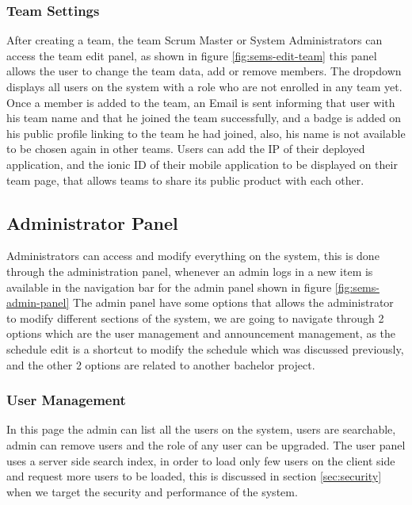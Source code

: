 \subsubsection{Team Settings}
\label{subs:team-settings}
After creating a team, the team Scrum Master or System Administrators can access the team edit panel, as shown in figure \ref{fig:sems-edit-team}
this panel allows the user to change the team data, add or remove members. The  dropdown displays all users on the system
with a  role who are not enrolled in any team yet. Once a member is added to the team, an Email is sent informing that user
with his team name and that he joined the team successfully, and a badge is added on his public profile linking to the team he had joined,
also, his name is not available to be chosen again in other teams. Users can add the IP of their deployed application, and the ionic ID of their
mobile application to be displayed on their team page, that allows teams to share its public product with each other.

\subsection{Administrator Panel}
\label{sub:admin-panel}
Administrators can access and modify everything on the system, this is done through the administration panel, whenever an admin logs in
a new item is available in the navigation bar for the admin panel shown in figure \ref{fig:sems-admin-panel}
\newParagraph
The admin panel have some options that allows the administrator to modify different sections of the system, we are going
to navigate through 2 options which are the user management and announcement management, as the schedule edit is a shortcut to modify
the schedule which was discussed previously, and the other 2 options are related to another bachelor project.

\subsubsection{User Management}
\label{subs:admin-users}
In this page the admin can list all the users on the system, users are searchable, admin can remove users and the role of any user
can be upgraded. The user panel uses a server side search index, in order to load only few users on the client side and request more
users to be loaded, this is discussed in section \ref{sec:security} when we target the security and performance of the system.

